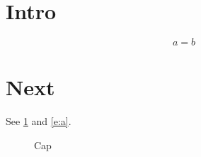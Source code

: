 \documentclass{article}
\begin{document}
\section{Intro}\label{s:a}
\begin{equation}a=b\label{e:a}\end{equation}
\section{Next}
See \ref{s:a} and \eqref{e:a}.
\begin{figure}\caption{Cap}\label{f:a}\end{figure}
\end{document}
